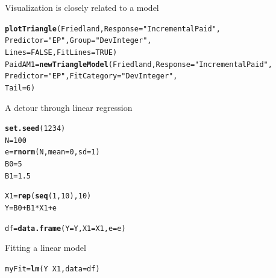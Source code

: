 \documentclass[xcolor=dvipsnames]{beamer}\usepackage{graphicx, color}
\makeatletter
\newcommand{\hlfunctioncall}[1]{\textcolor[rgb]{0.501960784313725,0,0.329411764705882}{\textbf{#1}}}%
\newcommand{\hlstring}[1]{\textcolor[rgb]{0.6,0.6,1}{#1}}%
\newenvironment{kframe}{%
 \def\at@end@of@kframe{}%
 \ifinner\ifhmode%
  \def\at@end@of@kframe{\end{minipage}}%
  \begin{minipage}{\columnwidth}%
 \fi\fi%
 \def\FrameCommand##1{\hskip\@totalleftmargin \hskip-\fboxsep
 \colorbox{shadecolor}{##1}\hskip-\fboxsep
     \hskip-\linewidth \hskip-\@totalleftmargin \hskip\columnwidth}%
 \MakeFramed {\advance\hsize-\width
   \@totalleftmargin\z@ \linewidth\hsize
   \@setminipage}}%
 {\par\unskip\endMakeFramed%
 \at@end@of@kframe}
\newenvironment{knitrout}{}{} %
\makeatother
\begin{document}
\begin{frame}[fragile]{Visualization is closely related to a model}
\begin{knitrout}
\color{fgcolor}\begin{kframe}
\begin{alltt}
\hlfunctioncall{plotTriangle}(Friedland, Response = \hlstring{"IncrementalPaid"}, 
    Predictor = \hlstring{"EP"}, Group = \hlstring{"DevInteger"}, 
    Lines = FALSE, FitLines = TRUE)
PaidAM1 = \hlfunctioncall{newTriangleModel}(Friedland, Response = \hlstring{"IncrementalPaid"}, 
    Predictor = \hlstring{"EP"}, FitCategory = \hlstring{"DevInteger"}, 
    Tail = 6)
\end{alltt}
\end{kframe}
\end{knitrout}

\end{frame}

\begin{frame}[fragile]{A detour through linear regression}
\begin{knitrout}
\color{fgcolor}\begin{kframe}
\begin{alltt}
\hlfunctioncall{set.seed}(1234)
N = 100
e = \hlfunctioncall{rnorm}(N, mean = 0, sd = 1)
B0 = 5
B1 = 1.5

X1 = \hlfunctioncall{rep}(\hlfunctioncall{seq}(1, 10), 10)
Y = B0 + B1 * X1 + e

df = \hlfunctioncall{data.frame}(Y = Y, X1 = X1, e = e)
\end{alltt}
\end{kframe}
\end{knitrout}

\end{frame}

\begin{frame}[fragile]{Fitting a linear model}
\begin{knitrout}
\color{fgcolor}\begin{kframe}
\begin{alltt}
myFit = \hlfunctioncall{lm}(Y ~ X1, data = df)
\end{alltt}
\end{kframe}
\end{knitrout}

\end{frame}
\end{document}
